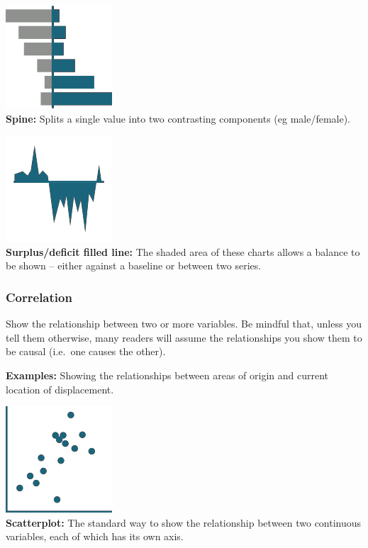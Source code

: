 \documentclass[
  a4paper,
  onecolumn,
  oneside]{book}
\begin{document}
\includegraphics{part1/images/deviation3.png}\\
\textbf{Spine:} Splits a single value into two contrasting components
(eg male/female).

\includegraphics{part1/images/deviation4.png}\\
\textbf{Surplus/deficit filled line:} The shaded area of these charts
allows a balance to be shown -- either against a baseline or between two
series.

\hypertarget{correlation}{%
\subsubsection{Correlation}\label{correlation}}

Show the relationship between two or more variables. Be mindful that,
unless you tell them otherwise, many readers will assume the
relationships you show them to be causal (i.e.~one causes the other).

\textbf{Examples:} Showing the relationships between areas of origin and
current location of displacement.

\includegraphics{part1/images/corellation1.png}\\
\textbf{Scatterplot:} The standard way to show the relationship between
two continuous variables, each of which has its own axis.
\end{document}
